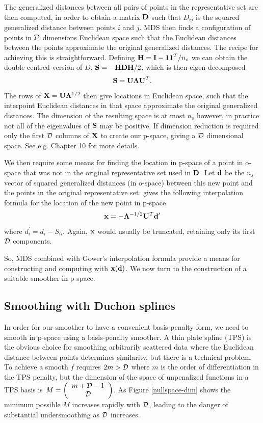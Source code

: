 \documentclass[smallextended]{svjour3}       %
\newcommand{\ts}{^T}
\begin{document}
The generalized distances between all pairs of points in the representative set are then computed, in order to obtain a matrix $\bf D$ such that $D_{ij}$ is the squared generalized distance between points $i$ and $j$. MDS then finds a configuration of points in $\cal D$ dimensions Euclidean space such that the Euclidean distances between the points approximate the original generalized distances. The recipe for achieving this is straightforward. Defining ${\bf H} = {\bf I} - {\bf 11}\ts/n_s$ we can obtain the double centred version of $D$, ${\bf S} = - {\bf HDH}/2$, which is then eigen-decomposed
$$
{\bf S} = {\bf U}{\bm \Lambda}{\bf U}\ts.
$$ 
The rows of  ${\bf X }= {\bf U}{\bm \Lambda}^{1/2}$ then give locations in Euclidean space, such that the interpoint Euclidean distances in that space approximate the original generalized distances. The dimension of the resulting space is at most $n_s$ however, in practice not all of the eigenvalues of ${\bf S}$ may be positive. If dimension reduction is required only the first $\cal D$ columns of $\bf X$ to create our p-space, giving a $\cal D$ dimensional space. See e.g. \cite{chatfield1980introduction} Chapter 10 for more details.

We then require some means for finding the location in p-space of a point in o-space that was not in the original representative set used in $\bf D$. Let $\bf d$ be the $n_s$ vector of squared generalized distances (in o-space) between this new point and the points in the original representative set. \cite{Gower:1968to} gives the following interpolation formula for the location of the new point in p-space 
$$
{\bf x} = - {\bm \Lambda}^{-1/2} {\bf U}\ts {\bf d}^\prime
$$
where $d^\prime_i = d_i - S_{ii}$. Again, $\bf x$ would usually be truncated, retaining only its first $\cal D $ components. 

So, MDS combined with Gower's interpolation formula provide a means for constructing and computing with ${\bf x}({\bf d})$. We now turn to the construction of a suitable smoother in p-space.

\subsection{Smoothing with Duchon splines}
\label{ss:duchon}

In order for our smoother to have a convenient basis-penalty form, we need to smooth in p-space using a basis-penalty smoother. A thin plate spline (TPS) is the obvious choice for smoothing arbitrarily scattered data where the Euclidean distance between points determines similarity, but there is a technical problem. To achieve a smooth $f$ requires $2m > {\cal D}$ where $m$ is the order of differentiation in the TPS penalty, but the dimension of the space of unpenalized functions in a TPS basis is 
$ M = \left ( \begin{array}{c} m + {\cal D} - 1 \\ {\cal D} \end{array} \right )$. As Figure \ref{nullspace-dim} shows the minimum possible $M$ increases rapidly with $\cal D$, leading to the danger of substantial undersmoothing as $\cal D$ increases.
\end{document}
